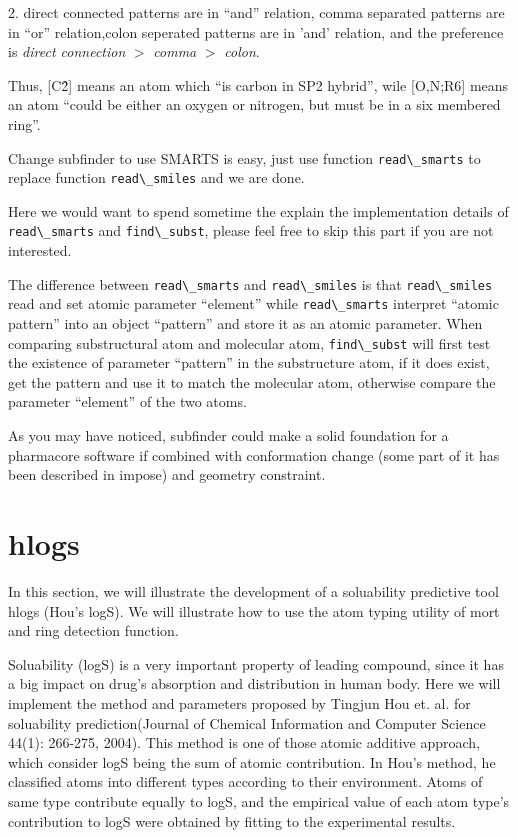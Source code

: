 \documentclass[letterpaper]{book}
\begin{document}
2. direct connected patterns are in ``and'' relation, comma separated patterns are in ``or'' 
relation,colon seperated patterns are in 'and' relation, and the preference is 
{\it direct connection} $>$ {\it comma} $>$ {\it colon}. 

  Thus, [C\^2] means an atom which ``is carbon in SP2 hybrid'', wile [O,N;R6] means an atom 
``could be either an oxygen or nitrogen, but must be in a six membered ring''.

 
  Change subfinder to use SMARTS is easy, just use function \lstinline$read\_smarts$ to replace
function \lstinline$read\_smiles$ and we are done. 

   Here we would want to spend sometime the explain the implementation details of \lstinline$read\_smarts$
and \lstinline$find\_subst$, please feel free to skip this part if you are not interested.


 The difference between \lstinline$read\_smarts$ and \lstinline$read\_smiles$ is that \lstinline$read\_smiles$
 read and set atomic parameter ``element'' while \lstinline$read\_smarts$ interpret ``atomic pattern'' into 
an object ``pattern'' and store it as an atomic parameter. When comparing substructural atom and molecular 
atom, \lstinline$find\_subst$ will first test the existence of parameter ``pattern'' in the substructure atom, 
if it does exist, get the pattern and use it to match the molecular atom, otherwise compare the parameter
``element'' of the two atoms.


  As you may have noticed, subfinder could make a solid foundation for a pharmacore software if 
combined with conformation change (some part of it has been described in impose) and geometry 
constraint.



\section{hlogs}
  In this section, we will illustrate the development of a soluability predictive tool hlogs 
(Hou's logS). We will illustrate how to use the atom typing utility of mort and ring detection 
function.
 
  
  Soluability (logS) is a very important property of leading compound, since it has a big 
impact on drug's absorption and distribution in human body. Here we will implement the method 
and parameters proposed by Tingjun Hou et. al. for soluability prediction(Journal of Chemical Information
and Computer Science 44(1): 266-275,  2004). 
   This method is one of those atomic additive approach, which consider logS being the sum 
of atomic contribution. In Hou's method, he classified atoms into different types according to
their environment.  Atoms of same type contribute equally to logS, and 
the empirical value of each atom type's contribution to logS were obtained by fitting to the experimental 
results. 
\end{document}
